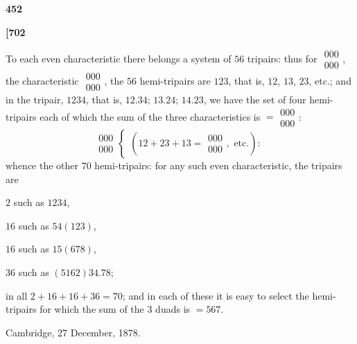 \documentclass[12pt,a4paper]{article}
\theoremstyle{definition}
\begin{document}
\vspace{1em}

\begin{center}
\textbf{452}
\end{center}

\vspace{0.5em}

\noindent\textbf{[702}

\vspace{0.5em}

To each even characteristic there belongs a system of $56$ tripairs: thus for $\begin{matrix} 000 \\ 000 \end{matrix}$, the characteristic $\begin{matrix} 000 \\ 000 \end{matrix}$, the $56$ hemi-tripairs are $123$, that is, $12$, $13$, $23$, etc.; and in the tripair, $1234$, that is, $12.34$; $13.24$; $14.23$, we have the set of four hemi-tripairs each of which the sum of the three characteristics is $= \begin{matrix} 000 \\ 000 \end{matrix}$:
\[
\begin{matrix} 000 \\ 000 \end{matrix}
\begin{cases}
(12 + 23 + 13 = \begin{matrix} 000 \\ 000 \end{matrix}, \text{ etc.}):
\end{cases}
\]
whence the other $70$ hemi-tripairs: for any such even characteristic, the tripairs are

$2$ such as $1234$,

$16$ such as $54(123)$,

$16$ such as $15(678)$,

$36$ such as $(5162)34.78$;

\noindent in all $2 + 16 + 16 + 36 = 70$; and in each of these it is easy to select the hemi-tripairs for which the sum of the $3$ duads is $= 567$.

\vspace{1em}

\begin{flushright}
Cambridge, 27 December, 1878.
\end{flushright}
\end{document}
